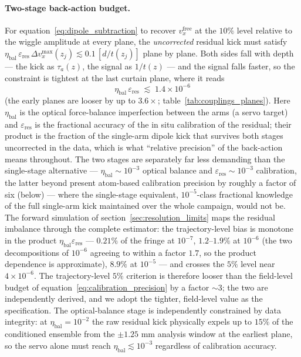 \documentclass[11pt,a4paper]{article}
\begin{document}
\paragraph{Two-stage back-action budget.} For equation~\eqref{eq:dipole_subtraction} to recover $v_x^\text{free}$ at the $10\%$ level relative to the wiggle amplitude at every plane, the \emph{uncorrected} residual kick must satisfy $\eta_\text{bal}\,\varepsilon_\text{res}\,\Delta v_x^\text{max}(z_j) \lesssim 0.1\,[d/t(z_j)]$ plane by plane. Both sides fall with depth --- the kick as $\tau_a(z)$, the signal as $1/t(z)$ --- and the signal falls faster, so the constraint is tightest at the last curtain plane, where it reads
\begin{equation}
\eta_\text{bal}\,\varepsilon_\text{res} \;\lesssim\; 1.4\times 10^{-6}
\label{eq:calibration_precision}
\end{equation}
(the early planes are looser by up to $3.6\times$; table~\ref{tab:couplings_planes}). Here $\eta_\text{bal}$ is the optical force-balance imperfection between the arms (a servo target) and $\varepsilon_\text{res}$ is the fractional accuracy of the in situ calibration of the residual; their product is the fraction of the single-arm dipole kick that survives both stages uncorrected in the data, which is what ``relative precision'' of the back-action means throughout. The two stages are separately far less demanding than the single-stage alternative --- $\eta_\text{bal} \sim 10^{-3}$ optical balance and $\varepsilon_\text{res} \sim 10^{-3}$ calibration, the latter beyond present atom-based calibration precision by roughly a factor of six (below) --- where the single-stage equivalent, $10^{-5}$-class fractional knowledge of the full single-arm kick maintained over the whole campaign, would not be. The forward simulation of section~\ref{sec:resolution_limits} maps the residual imbalance through the complete estimator: the trajectory-level bias is monotone in the product $\eta_\text{bal}\varepsilon_\text{res}$ --- $0.21\%$ of the fringe at $10^{-7}$, $1.2$--$1.9\%$ at $10^{-6}$ (the two decompositions of $10^{-6}$ agreeing to within a factor $1.7$, so the product dependence is approximate), $8.9\%$ at $10^{-5}$ --- and crosses the $5\%$ level near $4\times 10^{-6}$. The trajectory-level $5\%$ criterion is therefore looser than the field-level budget of equation~\eqref{eq:calibration_precision} by a factor $\sim 3$; the two are independently derived, and we adopt the tighter, field-level value as the specification. The optical-balance stage is independently constrained by data integrity: at $\eta_\text{bal} = 10^{-2}$ the raw residual kick physically expels up to $15\%$ of the conditioned ensemble from the $\pm 1.25$ mm analysis window at the earliest plane, so the servo alone must reach $\eta_\text{bal} \lesssim 10^{-3}$ regardless of calibration accuracy.
\end{document}

